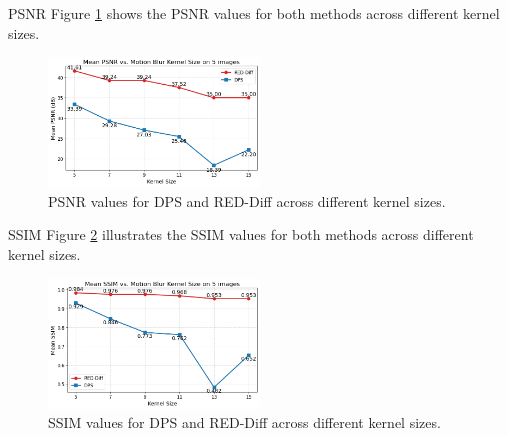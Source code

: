 \begin{frame}{PSNR}
    Figure \ref{fig:psnr_results} shows the PSNR values for both methods across different kernel sizes.
    \begin{figure}
        \centering
        \includegraphics[width=0.5\textwidth]{media/mean_psnr_over_kernels.png}
        \caption{PSNR values for DPS and RED-Diff across different kernel sizes.}
        \label{fig:psnr_results}
    \end{figure}
\end{frame}

\begin{frame}{SSIM}
    Figure \ref{fig:ssim_results} illustrates the SSIM values for both methods across different kernel sizes.
    \begin{figure}
        \centering
        \includegraphics[width=0.5\textwidth]{media/mean_ssim_over_kernels.png}
        \caption{SSIM values for DPS and RED-Diff across different kernel sizes.}
        \label{fig:ssim_results}
    \end{figure}
\end{frame}


